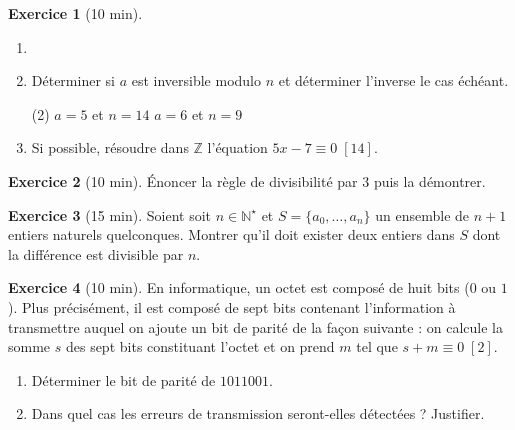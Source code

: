 \documentclass{exam}
\theoremstyle{definition}
\newtheorem{exercice}{Exercice}
\begin{document}
    \begin{exercice}[10 min]
        \begin{enumerate}
            \item[]
            \item Déterminer si $a$ est inversible modulo $n$ et déterminer l’inverse le cas échéant.
            \begin{tasks}(2)
                \task $a = 5$ et $n = 14$
                \task $a = 6$ et $n = 9$
            \end{tasks}
            \item Si possible, résoudre dans $\mathbb{Z}$ l'équation $5x -7 \equiv 0 \; [14]$.
        \end{enumerate}
    \end{exercice}
    
    \begin{exercice}[10 min]
        Énoncer la règle de divisibilité par $3$ puis la démontrer.
    \end{exercice}

    \begin{exercice}[15 min]
        Soient soit $n \in \mathbb{N}^\star$ et $S = \{a_0, \dots, a_n\}$ un ensemble de $n+1$ entiers naturels quelconques.
        Montrer qu'il doit exister deux entiers dans $S$ dont la différence est divisible par $n$.
    \end{exercice}
    
    \begin{exercice}[10 min]
        En informatique, un octet est composé de huit bits ($0$ ou $1$). Plus précisément, il est composé de sept bits contenant l’information à transmettre auquel on ajoute un bit de parité de la façon suivante : on calcule la somme $s$ des sept bits constituant l’octet et on prend $m$ tel que $s + m \equiv 0 \; [2]$.
        \begin{enumerate}
            \item Déterminer le bit de parité de $1011001$.
            \item Dans quel cas les erreurs de transmission seront-elles détectées ? Justifier.
        \end{enumerate}
    \end{exercice}
\end{document}

